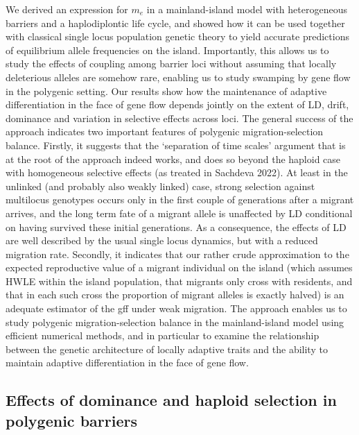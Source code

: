 \documentclass[
  11pt,
]{article}
\begin{document}
We derived an expression for \(m_e\) in a mainland-island model with
heterogeneous barriers and a haplodiplontic life cycle, and showed how
it can be used together with classical single locus population genetic
theory to yield accurate predictions of equilibrium allele frequencies
on the island. Importantly, this allows us to study the effects of
coupling among barrier loci without assuming that locally deleterious
alleles are somehow rare, enabling us to study swamping by gene flow in
the polygenic setting. Our results show how the maintenance of adaptive
differentiation in the face of gene flow depends jointly on the extent
of LD, drift, dominance and variation in selective effects across loci.
The general success of the approach indicates two important features of
polygenic migration-selection balance. Firstly, it suggests that the
`separation of time scales' argument that is at the root of the approach
indeed works, and does so beyond the haploid case with homogeneous
selective effects (as treated in Sachdeva 2022). At least in the
unlinked (and probably also weakly linked) case, strong selection
against multilocus genotypes occurs only in the first couple of
generations after a migrant arrives, and the long term fate of a migrant
allele is unaffected by LD conditional on having survived these initial
generations. As a consequence, the effects of LD are well described by
the usual single locus dynamics, but with a reduced migration rate.
Secondly, it indicates that our rather crude approximation to the
expected reproductive value of a migrant individual on the island (which
assumes HWLE within the island population, that migrants only cross with
residents, and that in each such cross the proportion of migrant alleles
is exactly halved) is an adequate estimator of the gff under weak
migration. The approach enables us to study polygenic
migration-selection balance in the mainland-island model using efficient
numerical methods, and in particular to examine the relationship between
the genetic architecture of locally adaptive traits and the ability to
maintain adaptive differentiation in the face of gene flow.

\hypertarget{effects-of-dominance-and-haploid-selection-in-polygenic-barriers}{%
\subsection{Effects of dominance and haploid selection in polygenic
barriers}\label{effects-of-dominance-and-haploid-selection-in-polygenic-barriers}}
\end{document}
